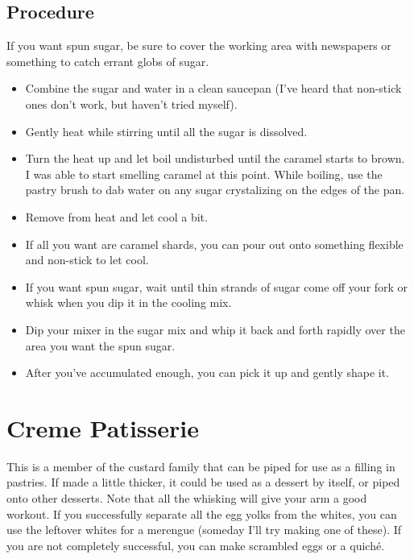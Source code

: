 \documentclass[10pt, openany]{book}
\begin{document}
\subsection{Procedure}
If you want spun sugar, be sure to cover the working area with newspapers or something to catch errant globs of sugar.
\begin{itemize}
  \item Combine the sugar and water in a clean saucepan (I've heard that non-stick ones don't work, but haven't tried myself).
  \item Gently heat while stirring until all the sugar is dissolved.
  \item Turn the heat up and let boil undisturbed until the caramel starts to brown.  I was able to start smelling caramel at this point.  While boiling, use the pastry brush to dab water on any sugar crystalizing on the edges of the pan.
  \item Remove from heat and let cool a bit.
  \item If all you want are caramel shards, you can pour out onto something flexible and non-stick to let cool.
  \item If you want spun sugar, wait until thin strands of sugar come off your fork or whisk when you dip it in the cooling mix.
  \item Dip your mixer in the sugar mix and whip it back and forth rapidly over the area you want the spun sugar.
  \item After you've accumulated enough, you can pick it up and gently shape it.
\end{itemize}

\section{Creme Patisserie}
\label{extra:CremePat}
This is a member of the custard family that can be piped for use as a filling in pastries.  If made a little thicker, it could be used as a dessert by itself, or piped onto other desserts.  Note that all the whisking will give your arm a good workout.  If you successfully separate all the egg yolks from the whites, you can use the leftover whites for a merengue (someday I'll try making one of these).  If you are not completely successful, you can make scrambled eggs or a quich\'e.
\end{document}
